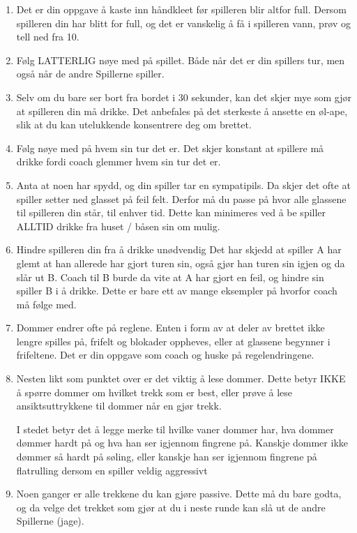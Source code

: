 \documentclass[10pt,a4paper,norsk,openany]{book}
\begin{document}
\begin{enumerate}
  \item Det er din oppgave å kaste inn håndkleet før spilleren blir altfor full.
    Dersom spilleren din har blitt for full, og det er vanskelig å få i
    spilleren vann, prøv og tell ned fra 10. 
    \item Følg LATTERLIG nøye med på spillet. Både når det er din spillers tur,
    men også når de andre Spillerne spiller. 
  \item Selv om du bare ser bort fra bordet i 30 sekunder, kan det skjer
    mye som gjør at spilleren din må drikke. Det anbefales på det sterkeste å
    ansette en øl-ape, slik at du kan utelukkende konsentrere deg om brettet. 
  \item Følg nøye med på hvem sin tur det er. Det skjer konstant at spillere må
    drikke fordi coach glemmer hvem sin tur det er.
  \item Anta at noen har spydd, og din spiller tar en sympatipils. Da skjer det
    ofte at spiller setter ned glasset på feil felt. Derfor må du passe på hvor
    alle glassene til spilleren din står, til enhver tid. Dette kan minimeres
    ved å be spiller ALLTID drikke fra huset / båsen sin om mulig.
  \item Hindre spilleren din fra å drikke unødvendig Det har skjedd at spiller
    A har glemt at han allerede har gjort turen sin, også gjør han turen sin
    igjen og da slår ut B. Coach til B burde da vite at A har gjort en feil, og
    hindre sin spiller B i å drikke. Dette er bare ett av mange eksempler på
    hvorfor coach må følge med.
  \item Dommer endrer ofte på reglene. Enten i form av at deler av brettet ikke
    lengre spilles på, frifelt og blokader oppheves, eller at glassene begynner
    i frifeltene. Det er din oppgave som coach og huske på regelendringene.
  \item Nesten likt som punktet over er det viktig å lese dommer. Dette betyr
    IKKE å spørre dommer om hvilket trekk som er best, eller prøve å lese
    ansiktsuttrykkene til dommer når en gjør trekk.

    I stedet betyr det å legge merke til hvilke vaner dommer har, hva dommer
    dømmer hardt på og hva han ser igjennom fingrene på. Kanskje dommer ikke
    dømmer så hardt på søling, eller kanskje han ser igjennom fingrene på
    flatrulling dersom en spiller veldig aggressivt
  \item Noen ganger er alle trekkene du kan gjøre passive. Dette må du bare
    godta, og da velge det trekket som gjør at du i neste runde kan slå ut de
    andre Spillerne (jage).
\end{enumerate}
\end{document}
